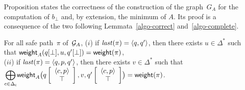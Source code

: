 Proposition states the correctness of the construction of the graph~$G_A$ for the computation of $b_\bot$
and, by extension, the minimum of $A$.
Its proof is a consequence of the two following Lemmata~\ref{algo-correct} and~\ref{algo-complete}.


\begin{lemma}[Correctness]\label{algo-correct}
For all safe path~$\pi$ of~$\mathcal{G}_A$,  %
($i$) if $\last(\pi) = \< q, q'>$, %
then there exists $u \in \Delta^*$ such that 
$\mathsf{weight}_A(q[\bot], u, q'[\bot]) = \mathsf{weight}(\pi)$,\\
%
($ii$) if $\last(\pi) = \< q, p, q'>$, %
then there exists $v \in \Delta^*$ such that \\
${\displaystyle\bigoplus_{c \in \Deltac}}
 \weight_A\bigl(\configup{q}{\< c, p> \stackup \top }, v, \configup{q'}{\<c, p> \stackup \top}\bigr)
 = \weight(\pi)$.
\end{lemma}
%
